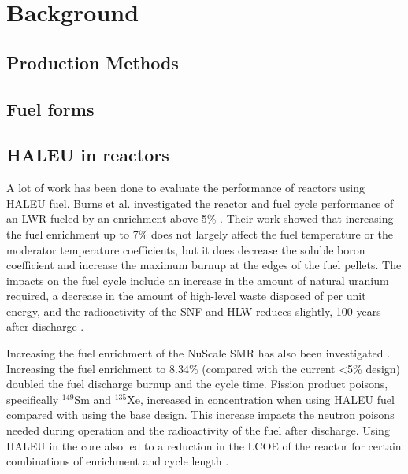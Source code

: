 \section{Background}


\subsection{Production Methods}


\subsection{Fuel forms}
\subsection{HALEU in reactors}
A lot of work has been done to evaluate the performance of reactors 
using \gls{HALEU} fuel. Burns et al. investigated the reactor and fuel cycle 
performance of an \gls{LWR} fueled by an enrichment above 5\% \cite{burns_reactor_2020}.
Their work showed that increasing the fuel enrichment up to 7\% does not 
largely affect the fuel temperature or the moderator temperature coefficients,
but it does decrease the soluble boron coefficient and increase the maximum 
burnup at the edges of the fuel pellets. The impacts on the fuel cycle include 
an increase in the amount of natural uranium required, a decrease in the 
amount of high-level waste disposed of per unit energy, and the 
radioactivity of the \gls{SNF} and \gls{HLW} reduces slightly, 100 years 
after discharge \cite{burns_reactor_2020}.

Increasing the fuel enrichment of the NuScale \gls{SMR} has also been 
investigated \cite{carlson_implications_2022}. Increasing the fuel 
enrichment to 8.34\% (compared with the current <5\% design) doubled 
the fuel discharge burnup and the cycle time. 
Fission product poisons, specifically $^{149}$Sm and $^{135}$Xe, increased 
in concentration when using \gls{HALEU} fuel compared with using the base 
design. This increase impacts the 
neutron poisons needed during operation and the radioactivity of 
the fuel after discharge. Using \gls{HALEU} in the core also led to a 
reduction in the \gls{LCOE} of the reactor for certain combinations of 
enrichment and cycle length \cite{carlson_economic_2020,carlson_implications_2022}.

